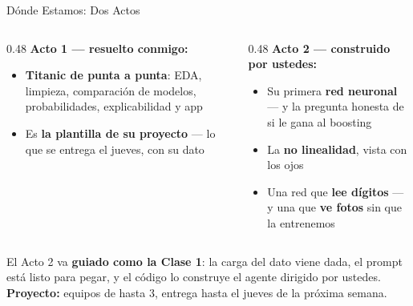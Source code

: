 \documentclass[aspectratio=169, 11pt]{beamer}
\begin{document}
\begin{frame}[shrink=5]{Dónde Estamos: Dos Actos}
  \vspace{-2pt}
  \begin{columns}[T]
    \begin{column}{0.48\textwidth}
      {\small\color{arcaDark}\bfseries\faTheaterMasks\hspace{5pt}Acto 1 --- resuelto conmigo:}
      \vspace{4pt}
      {\footnotesize\color{textMuted}
      \begin{itemize}\setlength{\itemsep}{4pt}
        \item[{\color{arcaRed}\scriptsize\faArrowRight}]
          \textbf{Titanic de punta a punta}: EDA, limpieza, comparación de
          modelos, probabilidades, explicabilidad y app
        \item[{\color{arcaRed}\scriptsize\faArrowRight}]
          Es \textbf{la plantilla de su proyecto} --- lo que se entrega el
          jueves, con su dato
      \end{itemize}}
    \end{column}
    \begin{column}{0.48\textwidth}
      {\small\color{arcaDark}\bfseries\faBrain\hspace{5pt}Acto 2 --- construido por ustedes:}
      \vspace{4pt}
      {\footnotesize\color{textMuted}
      \begin{itemize}\setlength{\itemsep}{4pt}
        \item[{\color{codeGreen}\scriptsize\faCheck}]
          Su primera \textbf{red neuronal} --- y la pregunta honesta de si
          le gana al boosting
        \item[{\color{codeGreen}\scriptsize\faCheck}]
          La \textbf{no linealidad}, vista con los ojos
        \item[{\color{codeGreen}\scriptsize\faCheck}]
          Una red que \textbf{lee dígitos} --- y una que \textbf{ve fotos}
          sin que la entrenemos
      \end{itemize}}
    \end{column}
  \end{columns}
  \vspace{6pt}
  \begin{tcolorbox}[colback=arcaGray, colframe=arcaDark, boxrule=0pt,
    leftrule=3pt, arc=3pt, left=8pt, right=8pt, top=4pt, bottom=4pt]
    {\scriptsize\color{textMuted}
     El Acto 2 va \textbf{guiado como la Clase 1}: la carga del dato viene
     dada, el prompt está listo para pegar, y el código lo construye el
     agente dirigido por ustedes. \textbf{Proyecto:} equipos de hasta 3,
     entrega hasta el jueves de la próxima semana.}
  \end{tcolorbox}
\end{frame}
\end{document}

